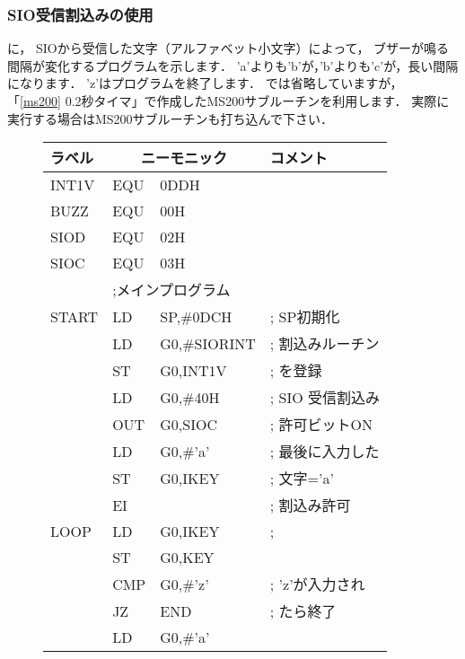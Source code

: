 \subsubsection{SIO受信割込みの使用}
に，
SIOから受信した文字（アルファベット小文字）によって，
ブザーが鳴る間隔が変化するプログラムを示します．
'a'よりも'b'が，'b'よりも'c'が，長い間隔になります．
'z'はプログラムを終了します．
では省略していますが，
「\ref{ms200} 0.2秒タイマ」で作成したMS200サブルーチンを利用します．
実際に実行する場合はMS200サブルーチンも打ち込んで下さい．

\begin{figure}[btp]
{\small\tt\begin{center}
\begin{tabular}{|l|l l l|} \hline
ラベル & \multicolumn{2}{|c}{ニーモニック} & コメント  \\
\hline
INT1V   & EQU     & 0DDH           & \\
BUZZ    & EQU     & 00H            & \\
SIOD    & EQU     & 02H            & \\
SIOC    & EQU     & 03H            & \\
        & \multicolumn{3}{|l|}{;メインプログラム}        \\
START   & LD      & SP,\#0DCH      & ; SP初期化\\
        & LD      & G0,\#SIORINT   & ; 割込みルーチン\\
        & ST      & G0,INT1V       & ; を登録\\
        & LD      & G0,\#40H       & ; SIO 受信割込み\\
        & OUT     & G0,SIOC        & ; 許可ビットON\\
        & LD      & G0,\#'a'       & ; 最後に入力した\\
        & ST      & G0,IKEY        & ; 文字='a'\\
        & EI      &                & ; 割込み許可\\
LOOP    & LD      & G0,IKEY        & ; \\
        & ST      & G0,KEY         & \\
        & CMP     & G0,\#'z'       & ; 'z'が入力され\\
        & JZ      & END            & ; たら終了\\
        & LD      & G0,\#'a'       & \\

\end{tabular}
\end{center}}
\end{figure}
